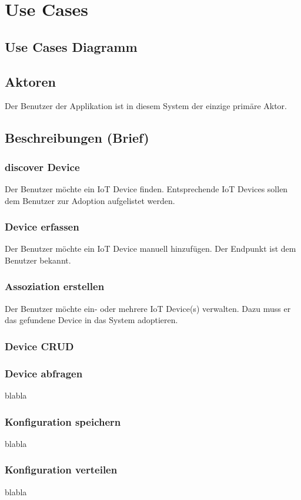 \section{Use Cases}
\subsection{Use Cases Diagramm}
\subsection{Aktoren}
Der Benutzer der Applikation ist in diesem System der einzige primäre Aktor.
\subsection{Beschreibungen (Brief)}
\subsubsection{discover Device}
Der Benutzer möchte ein IoT Device finden. Entsprechende IoT Devices sollen dem Benutzer zur Adoption aufgelistet werden. 
\subsubsection{Device erfassen}
Der Benutzer möchte ein IoT Device manuell hinzufügen. Der Endpunkt ist dem Benutzer bekannt. 
\subsubsection{Assoziation erstellen}
Der Benutzer möchte ein- oder mehrere IoT Device(s) verwalten. Dazu muss er das gefundene Device in das System adoptieren. 
\subsubsection{Device CRUD}

\subsubsection{Device abfragen}
blabla
\subsubsection{Konfiguration speichern}
blabla
\subsubsection{Konfiguration verteilen}
blabla
